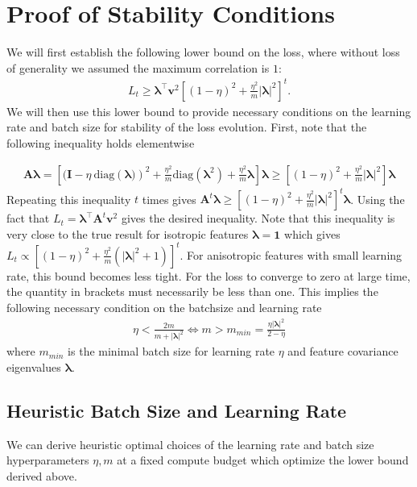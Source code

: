 \documentclass{article} %
\def\A{\mathbf A}
\begin{document}
\section{Proof of Stability Conditions}\label{stability_proof}

We will first establish the following lower bound on the loss, where without loss of generality we assumed the maximum correlation is $1$:
\begin{align}
    L_t \geq \bm \lambda^\top \mathbf{v}^2 \left[ (1-\eta)^2 + \frac{\eta^2}{m} |\bm\lambda|^2 \right]^t .
\end{align}
We will then use this lower bound to provide necessary conditions on the learning rate and batch size for stability of the loss evolution. First, note that the following inequality holds elementwise

\begin{align}
    \A \bm\lambda = \left[ (\bm I - \eta \ \text{diag}\left( \bm \lambda) \right)^2 + \frac{\eta^2}{m} \text{diag}(\bm\lambda^2) + \frac{\eta^2}{m} \bm\lambda \right] \bm\lambda \geq \left[ (1-\eta)^2 + \frac{\eta^2}{m} |\bm\lambda|^2 \right] \bm\lambda
\end{align}
%
Repeating this inequality $t$ times gives $\bm A^t \bm\lambda \geq \left[ (1-\eta)^2 + \frac{\eta^2}{m}|\bm\lambda|^2 \right]^t \bm\lambda$. Using the fact that $L_t = \bm\lambda^\top \A^t \mathbf{v}^2$ gives the desired inequality. Note that this inequality is very close to the true result for isotropic features $\bm\lambda=\bm 1$ which gives $L_t \propto \left[ (1-\eta)^2 + \frac{\eta^2}{m} (|\bm\lambda|^2+1) \right]^t$. For anisotropic features with small learning rate, this bound becomes less tight.
%
For the loss to converge to zero at large time, the quantity in brackets must necessarily be less than one. This implies the following necessary condition on the batchsize and learning rate
\begin{align}
    \eta < \frac{2 m}{m + |\bm\lambda|^2}  \iff m > m_{min} = \frac{\eta |\bm\lambda|^2}{2-\eta}
\end{align}
where $m_{min}$ is the minimal batch size for learning rate $\eta$ and feature covariance eigenvalues $\bm\lambda$.

\subsection{Heuristic Batch Size and Learning Rate}\label{app:heuristic_optimal_hyperparams}

We can derive heuristic optimal choices of the learning rate and batch size hyperparameters $\eta, m$ at a fixed compute budget which optimize the lower bound derived above. 
\end{document}
